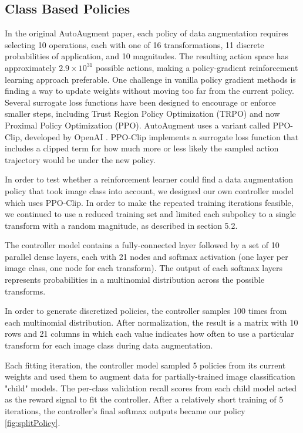 \documentclass[10pt,twocolumn,letterpaper]{article}
\begin{document}
    

  \subsection{Class Based Policies}

    In the original AutoAugment paper, each policy of data augmentation requires selecting 10 operations, each with one of 16 transformations, 11 discrete probabilities of application, and 10 magnitudes. The resulting action space has approximately $2.9 \times 10^{31}$ possible actions, making a policy-gradient reinforcement learning approach preferable. One challenge in vanilla policy gradient methods is finding a way to update weights without moving too far from the current policy. Several surrogate loss functions have been designed to encourage or enforce smaller steps, including Trust Region Policy Optimization (TRPO) and now Proximal Policy Optimization (PPO). AutoAugment uses a variant called PPO-Clip, developed by OpenAI \cite{Schulman2017}. PPO-Clip implements a surrogate loss function that includes a clipped term for how much more or less likely the sampled action trajectory would be under the new policy.

    In order to test whether a reinforcement learner could find a data augmentation policy that took image class into account, we designed our own controller model which uses PPO-Clip. In order to make the repeated training iterations feasible, we continued to use a reduced training set and limited each subpolicy to a single transform with a random magnitude, as described in section 5.2.

    The controller model contains a fully-connected layer followed by a set of 10 parallel dense layers, each with 21 nodes and softmax activation (one layer per image class, one node for each transform). The output of each softmax layers represents probabilities in a multinomial distribution across the possible transforms.

    In order to generate discretized policies, the controller samples 100 times from each multinomial distribution. After normalization, the result is a matrix with 10 rows and 21 columns in which each value indicates how often to use a particular transform for each image class during data augmentation.

    Each fitting iteration, the controller model sampled 5 policies from its current weights and used them to augment data for partially-trained image classification "child" models. The per-class validation recall scores from each child model acted as the reward signal to fit the controller. After a relatively short training of 5 iterations, the controller's final softmax outputs became our policy \ref{fig:splitPolicy}.
    
\end{document}
